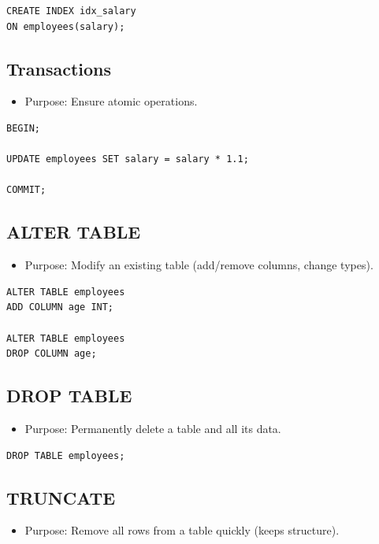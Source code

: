 \documentclass[10pt]{article}
\begin{document}
\begin{verbatim}
CREATE INDEX idx_salary
ON employees(salary);
\end{verbatim}

\subsection{\textbf{Transactions}}
\begin{itemize}
    \item Purpose: Ensure atomic operations.
\end{itemize}

\begin{verbatim}
BEGIN;

UPDATE employees SET salary = salary * 1.1;

COMMIT;
\end{verbatim}

\newpage 
\subsection{ALTER TABLE}
\begin{itemize}
    \item Purpose: Modify an existing table (add/remove columns, change types).
\end{itemize}

\begin{verbatim}
ALTER TABLE employees
ADD COLUMN age INT;

ALTER TABLE employees
DROP COLUMN age;
\end{verbatim}

\subsection{DROP TABLE}
\begin{itemize}
    \item Purpose: Permanently delete a table and all its data.
\end{itemize}

\begin{verbatim}
DROP TABLE employees;
\end{verbatim}

\subsection{TRUNCATE}
\begin{itemize}
    \item Purpose: Remove all rows from a table quickly (keeps structure).
\end{itemize}
\end{document}
